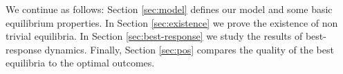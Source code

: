 \vspace{2mm}

We continue as follows: Section \ref{sec:model} defines our model and some basic equilibrium properties. In Section \ref{sec:existence} we prove the existence of non trivial equilibria. In Section \ref{sec:best-response} we study the results of best-response dynamics. Finally, Section \ref{sec:pos} compares the quality of the best equilibria to the optimal outcomes.






